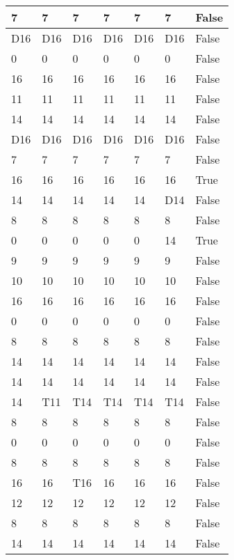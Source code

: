 \begin{longtable}[htbp]{| p{} | p{} | p{}| p{}| p{}| p{}| p{}|}
7 & 7 & 7 & 7 & 7 & 7 & False \\ \hline
\multicolumn{1}{|l|}{D16} & \multicolumn{1}{l|}{D16} & \multicolumn{1}{l|}{D16} & \multicolumn{1}{l|}{D16} & \multicolumn{1}{l|}{D16} & \multicolumn{1}{l|}{D16} & False \\ \hline
0 & 0 & 0 & 0 & 0 & 0 & False \\ \hline
16 & 16 & 16 & 16 & 16 & 16 & False \\ \hline
11 & 11 & 11 & 11 & 11 & 11 & False \\ \hline
14 & 14 & 14 & 14 & 14 & 14 & False \\ \hline
\multicolumn{1}{|l|}{D16} & \multicolumn{1}{l|}{D16} & \multicolumn{1}{l|}{D16} & \multicolumn{1}{l|}{D16} & \multicolumn{1}{l|}{D16} & \multicolumn{1}{l|}{D16} & False \\ \hline
7 & 7 & 7 & 7 & 7 & 7 & False \\ \hline
16 & 16 & 16 & 16 & 16 & 16 & True \\ \hline
14 & 14 & 14 & 14 & 14 & \multicolumn{1}{l|}{D14} & False \\ \hline
8 & 8 & 8 & 8 & 8 & 8 & False \\ \hline
0 & 0 & 0 & 0 & 0 & 14 & True \\ \hline
9 & 9 & 9 & 9 & 9 & 9 & False \\ \hline
10 & 10 & 10 & 10 & 10 & 10 & False \\ \hline
16 & 16 & 16 & 16 & 16 & 16 & False \\ \hline
0 & 0 & 0 & 0 & 0 & 0 & False \\ \hline
8 & 8 & 8 & 8 & 8 & 8 & False \\ \hline
14 & 14 & 14 & 14 & 14 & 14 & False \\ \hline
14 & 14 & 14 & 14 & 14 & 14 & False \\ \hline
14 & \multicolumn{1}{l|}{T11} & \multicolumn{1}{l|}{T14} & \multicolumn{1}{l|}{T14} & \multicolumn{1}{l|}{T14} & \multicolumn{1}{l|}{T14} & False \\ \hline
8 & 8 & 8 & 8 & 8 & 8 & False \\ \hline
0 & 0 & 0 & 0 & 0 & 0 & False \\ \hline
8 & 8 & 8 & 8 & 8 & 8 & False \\ \hline
16 & 16 & \multicolumn{1}{l|}{T16} & 16 & 16 & 16 & False \\ \hline
12 & 12 & 12 & 12 & 12 & 12 & False \\ \hline
8 & 8 & 8 & 8 & 8 & 8 & False \\ \hline
14 & 14 & 14 & 14 & 14 & 14 & False \\ \hline

\end{longtable}
